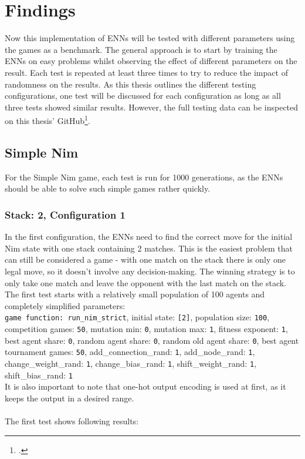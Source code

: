     \section{Findings}\label{sec:first-findings}
    Now this implementation of ENNs will be tested with different parameters using the games as a benchmark.
    The general approach is to start by training the ENNs on easy problems whilst observing the effect of different parameters on the result.
    Each test is repeated at least three times to try to reduce the impact of randomness on the results.
    As this thesis outlines the different testing configurations, one test will be discussed for each configuration as long as all three tests showed similar results.
    However, the full testing data can be inspected on this thesis' GitHub\footcite{RustENN}.

    \subsection{Simple Nim}\label{subsec:simple-nim-results}
    For the Simple Nim game, each test is run for 1000 generations, as the ENNs should be able to solve such simple games rather quickly.

    \subsubsection{Stack: 2, Configuration 1}
    In the first configuration, the ENNs need to find the correct move for the initial Nim state with one stack containing 2 matches.
    This is the easiest problem that can still be considered a game - with one match on the stack there is only one legal move, so it doesn't involve any decision-making.
    The winning strategy is to only take one match and leave the opponent with the last match on the stack.
    The first test starts with a relatively small population of 100 agents and completely simplified parameters:
    \\
    \texttt{game function: run\_nim\_strict}, initial state: \texttt{[2]}, population size: \texttt{100}, competition games: \texttt{50}, mutation min: \texttt{0}, mutation max: \texttt{1}, fitness exponent: \texttt{1}, best agent share:
    \texttt{0}, random agent share: \texttt{0}, random old agent share: \texttt{0}, best agent tournament games: \texttt{50}, add\_connection\_rand: \texttt{1}, add\_node\_rand: \texttt{1}, change\_weight\_rand: \texttt{1}, change\_bias\_rand: \texttt{1}, shift\_weight\_rand: \texttt{1}, shift\_bias\_rand: \texttt{1}\\
    It is also important to note that one-hot output encoding is used at first, as it keeps the output in a desired range.
    \\ \\
    The first test shows following results:
    \\
    \newcommand{\csvpath}{../data/simple_nim/stack_2/t_1/stats.csv} %

